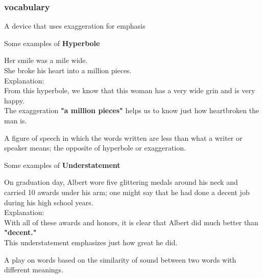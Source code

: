 
\subsubsection*{vocabulary}

\begin{definition}[Hyperbole]
    A device that uses exaggeration for emphasis
\end{definition}

\begin{example}
    Some examples of \textbf{Hyperbole}
    
    Her smile was a mile wide. \\
    She broke his heart into a million pieces. \\
    
    Explanation: \\
    
    From this hyperbole, we know that this woman has a very wide grin and is
    very happy. \\
    The exaggeration \textbf{"a million pieces"} helps us to know just how
    heartbroken the man is.
\end{example}

\begin{definition}[Understatement]
    A figure of speech in which the words written are less than what a writer
    or speaker means; the opposite of hyperbole or exaggeration.
\end{definition}

\begin{example}
    Some examples of \textbf{Understatement}
    
    On graduation day, Albert wore five glittering medals around his neck and
    carried 10 awards under his arm;
    one might say that he had done a decent job during his high school years. \\

    Explanation: \\
    
    With all of these awards and honors, it is clear that Albert did much
    better than \textbf{"decent."} \\
    This understatement emphasizes just how great he did.
\end{example}

\begin{definition}[Pun]
    A play on words based on the similarity of sound between two words with
    different meanings.
\end{definition}


